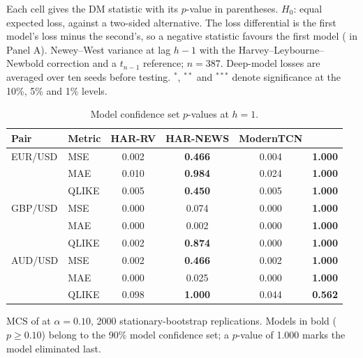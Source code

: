 \begin{table}[t]
\begin{threeparttable}
\begin{tablenotes}[flushleft]
    \item Each cell gives the DM statistic with its $p$-value in parentheses. $H_0$: equal expected loss, against a two-sided alternative. The loss differential is the first model's loss minus the second's, so a negative statistic favours the first model (\FiLMTCN{} in Panel A). Newey--West variance at lag $h-1$ with the Harvey--Leybourne--Newbold correction and a $t_{n-1}$ reference; $n=387$. Deep-model losses are averaged over ten seeds before testing. $^{*}$, $^{**}$ and $^{***}$ denote significance at the 10\%, 5\% and 1\% levels.
  \end{tablenotes}
  \end{threeparttable}
\end{table}

\begin{table}[t]
  \centering
  \setlength{\tabcolsep}{5pt}
  \begin{threeparttable}
  \caption{Model confidence set $p$-values at $h=1$.}
  \label{tab:mcs-h1}
  \begin{tabular}{llcccc}
    \toprule
    Pair & Metric & HAR-RV & HAR-NEWS & ModernTCN & \FiLMTCN{} \\
    \midrule
    EUR/USD            & MSE   & 0.002 & \textbf{0.466} & 0.004 & \textbf{1.000} \\
                       & MAE   & 0.010 & \textbf{0.984} & 0.024 & \textbf{1.000} \\
                       & QLIKE & 0.005 & \textbf{0.450} & 0.005 & \textbf{1.000} \\
    \addlinespace
    GBP/USD            & MSE   & 0.000 & 0.074 & 0.000 & \textbf{1.000} \\
                       & MAE   & 0.000 & 0.002 & 0.000 & \textbf{1.000} \\
                       & QLIKE & 0.002 & \textbf{0.874} & 0.000 & \textbf{1.000} \\
    \addlinespace
    AUD/USD            & MSE   & 0.002 & \textbf{0.466} & 0.002 & \textbf{1.000} \\
                       & MAE   & 0.000 & 0.025 & 0.000 & \textbf{1.000} \\
                       & QLIKE & 0.098 & \textbf{1.000} & 0.044 & \textbf{0.562} \\
    \bottomrule
  \end{tabular}
  \begin{tablenotes}[flushleft]\footnotesize
    \item MCS of \citet{hansen2011model} at $\alpha=0.10$, 2000 stationary-bootstrap replications. Models in bold ($p\geq0.10$) belong to the 90\% model confidence set; a $p$-value of 1.000 marks the model eliminated last.
  \end{tablenotes}
  \end{threeparttable}
\end{table}

